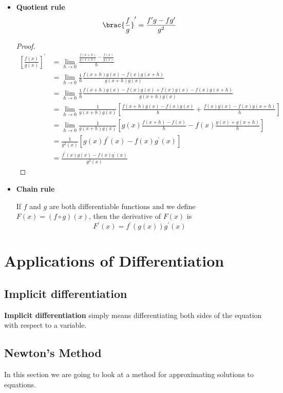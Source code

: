 \begin{itemize}
\item \textbf{Quotient rule}
\[ \brac{\frac{f}{g}}^\prime = \frac{f^\prime g - fg^\prime}{g^2} \] 

\begin{proof}
\begin{align*}
\left[\frac{f(x)}{g(x)}\right]^\prime &= \lim_{h \to 0} \frac{\frac{f(x+h)}{g(x+h)} - \frac{f(x)}{g(x)}}{h}\\
&= \lim_{h \to 0} \frac{1}{h} \frac{f(x+h) g(x) - f(x) g(x+h)}{g(x+h) g(x)}\\
&= \lim_{h \to 0} \frac{1}{h} \frac{f(x+h) g(x) - f(x) g(x) + f(x) g(x) - f(x) g(x+h)}{g(x+h) g(x)}\\
&= \lim_{h \to 0} \frac{1}{g(x+h) g(x)} \left[ \frac{f(x+h)g(x) - f(x)g(x)}{h} + \frac{f(x)g(x) - f(x)g(x+h)}{h} \right] \\
&= \lim_{h \to 0} \frac{1}{g(x+h) g(x)} \left[ g(x)\frac{f(x+h) - f(x)}{h} - f(x)\frac{g(x) + g(x+h)}{h} \right] \\
&= \frac{1}{g^2(x)} [g(x) f^\prime(x) - f(x) g^\prime(x)] \\
&= \frac{f^\prime(x) g(x) - f(x) g^\prime(x)}{g^2(x)}
\end{align*}
\end{proof}

\item \textbf{Chain rule}
\begin{theorem} 
If $f$ and $g$ are both differentiable functions and we define $F(x)=(f\circ g)(x)$, then the derivative of $F(x)$ is
\begin{equation}
F^\prime (x) = f^\prime(g(x)) g^\prime(x) 
\end{equation}
\end{theorem}
\end{itemize}

\section{Applications of Differentiation}
\subsection{Implicit differentiation}
\textbf{Implicit differentiation} simply means differentiating both sides of the equation with respect to a variable.

\subsection{Newton's Method}
In this section we are going to look at a method for approximating solutions to equations.

